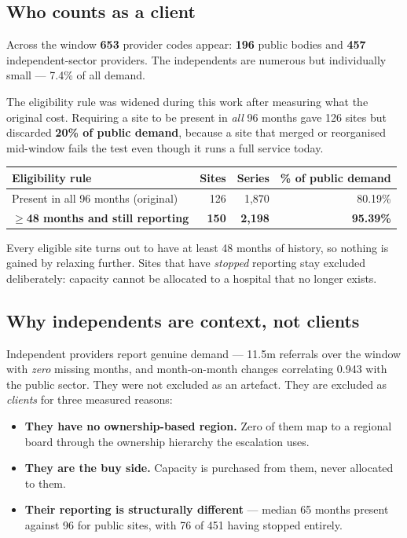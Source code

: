 \documentclass[11pt,a4paper]{article}
\begin{document}
\subsection{Who counts as a client}

Across the window \textbf{653} provider codes appear: \textbf{196} public bodies and \textbf{457}
independent-sector providers. The independents are numerous but individually small --- 7.4\% of all
demand.

The eligibility rule was widened during this work after measuring what the original cost. Requiring a
site to be present in \emph{all} 96 months gave 126 sites but discarded \textbf{20\% of public demand},
because a site that merged or reorganised mid-window fails the test even though it runs a full service
today.

\begin{center}
\begin{tabular}{@{}lrrr@{}}
\toprule
\textbf{Eligibility rule} & \textbf{Sites} & \textbf{Series} & \textbf{\% of public demand} \\
\midrule
Present in all 96 months (original) & 126 & 1{,}870 & 80.19\% \\
\textbf{$\geq$48 months and still reporting} & \textbf{150} & \textbf{2{,}198} & \textbf{95.39\%} \\
\bottomrule
\end{tabular}
\end{center}

Every eligible site turns out to have at least 48 months of history, so nothing is gained by relaxing
further. Sites that have \emph{stopped} reporting stay excluded deliberately: capacity cannot be
allocated to a hospital that no longer exists.

\subsection{Why independents are context, not clients}

Independent providers report genuine demand --- 11.5m referrals over the window with \emph{zero}
missing months, and month-on-month changes correlating 0.943 with the public sector. They were not
excluded as an artefact. They are excluded as \emph{clients} for three measured reasons:

\begin{itemize}[leftmargin=1.3em]
\item \textbf{They have no ownership-based region.} Zero of them map to a regional board through the
ownership hierarchy the escalation uses.
\item \textbf{They are the buy side.} Capacity is purchased from them, never allocated to them.
\item \textbf{Their reporting is structurally different} --- median 65 months present against 96 for
public sites, with 76 of 451 having stopped entirely.
\end{itemize}
\end{document}
